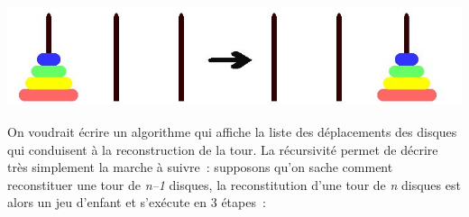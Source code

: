 		\begin{center}
		\includegraphics[width=14.002cm,height=3cm]{image/a2012Logique2eme-img022.jpg}
		\end{center}

		On voudrait écrire un algorithme qui affiche la liste des déplacements 
		des disques qui conduisent à la reconstruction de la tour. La récursivité 
		permet de décrire très simplement la marche à suivre~: supposons qu'on 
		sache comment reconstituer une tour de \textit{n--1} disques, la 
		reconstitution d'une tour de \textit{n} disques est alors un jeu d'enfant 
		et s'exécute en 3 étapes~:


